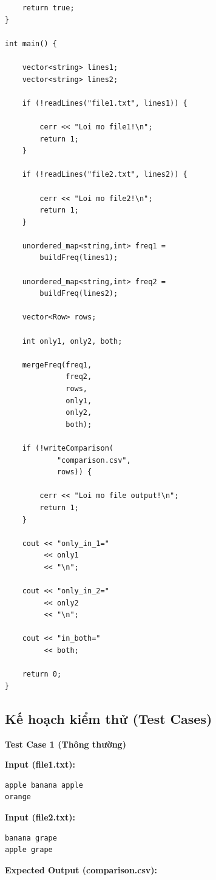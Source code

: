 \begin{lstlisting}
    return true;
}

int main() {

    vector<string> lines1;
    vector<string> lines2;

    if (!readLines("file1.txt", lines1)) {

        cerr << "Loi mo file1!\n";
        return 1;
    }

    if (!readLines("file2.txt", lines2)) {

        cerr << "Loi mo file2!\n";
        return 1;
    }

    unordered_map<string,int> freq1 =
        buildFreq(lines1);

    unordered_map<string,int> freq2 =
        buildFreq(lines2);

    vector<Row> rows;

    int only1, only2, both;

    mergeFreq(freq1,
              freq2,
              rows,
              only1,
              only2,
              both);

    if (!writeComparison(
            "comparison.csv",
            rows)) {

        cerr << "Loi mo file output!\n";
        return 1;
    }

    cout << "only_in_1="
         << only1
         << "\n";

    cout << "only_in_2="
         << only2
         << "\n";

    cout << "in_both="
         << both;

    return 0;
}
\end{lstlisting}

\subsection{Kế hoạch kiểm thử (Test Cases)}

\textbf{Test Case 1 (Thông thường)}

\textbf{Input (file1.txt):}

\begin{lstlisting}
apple banana apple
orange
\end{lstlisting}

\textbf{Input (file2.txt):}

\begin{lstlisting}
banana grape
apple grape
\end{lstlisting}

\textbf{Expected Output (comparison.csv):}

